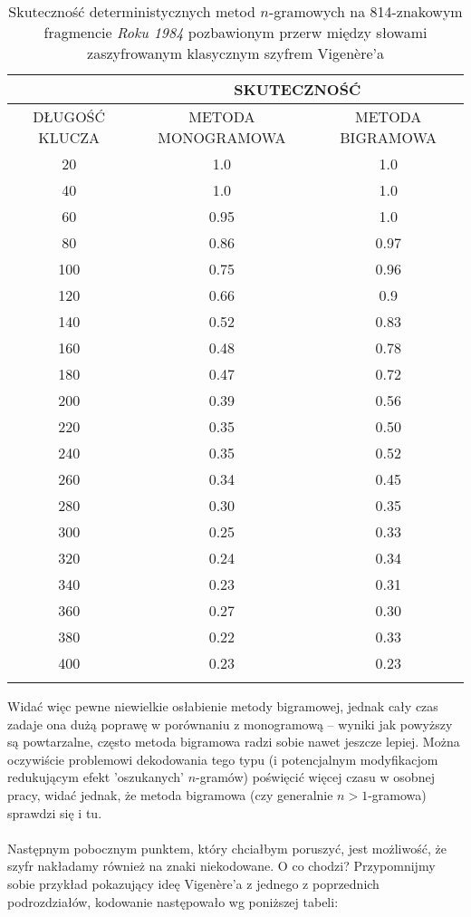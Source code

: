 \documentclass[a4paper]{article}
\theoremstyle{defn}
\theoremstyle{theorem}
\theoremstyle{lemma}
\theoremstyle{cor}
\theoremstyle{fact}
\begin{document}
\begin{center}\begin{longtable}{
|c|c|c|}
\hline &\multicolumn{2}{|c|}{SKUTECZNOŚĆ} \\
\hline DŁUGOŚĆ KLUCZA & METODA MONOGRAMOWA & METODA BIGRAMOWA\\ \hline
20
 & 1.0 & 1.0\\ \hline
40
 & 1.0 & 1.0\\ \hline
60
 & 0.95 & 1.0\\ \hline
80
 & 0.86 & 0.97\\ \hline
100
 & 0.75 & 0.96\\ \hline
120
 & 0.66 & 0.9\\ \hline
140
 & 0.52 & 0.83\\ \hline
160
 & 0.48 & 0.78\\ \hline
180
 & 0.47 & 0.72\\ \hline
200
 & 0.39 & 0.56\\ \hline
220
 & 0.35 & 0.50\\ \hline
240
 & 0.35 & 0.52\\ \hline
260
 & 0.34 & 0.45\\ \hline
280
 & 0.30 & 0.35\\ \hline
300
 & 0.25 & 0.33\\ \hline
320
 & 0.24 & 0.34\\ \hline
340
 & 0.23 & 0.31\\ \hline
360
 & 0.27 & 0.30\\ \hline
380
 & 0.22 & 0.33\\ \hline
400
 & 0.23 & 0.23\\ \hline
 \caption{Skuteczność deterministycznych metod $n$-gramowych na 814-znakowym fragmencie \textit{Roku 1984} pozbawionym przerw między słowami zaszyfrowanym klasycznym szyfrem Vigenère'a}
\end{longtable}\end{center}
Widać więc pewne niewielkie osłabienie metody bigramowej, jednak cały czas zadaje ona dużą poprawę w porównaniu z monogramową – wyniki jak powyższy są powtarzalne, często metoda bigramowa radzi sobie nawet jeszcze lepiej. Można oczywiście problemowi dekodowania tego typu (i potencjalnym modyfikacjom redukującym efekt 'oszukanych' $n$-gramów) poświęcić więcej czasu w osobnej pracy, widać jednak, że metoda bigramowa (czy generalnie $n>1$-gramowa) sprawdzi się i tu. \\\\
Następnym pobocznym punktem, który chciałbym poruszyć, jest możliwość, że szyfr nakładamy również na znaki niekodowane. O co chodzi? Przypomnijmy sobie przykład pokazujący ideę Vigenère'a z jednego z poprzednich podrozdziałów, kodowanie następowało wg poniższej tabeli:
\end{document}
